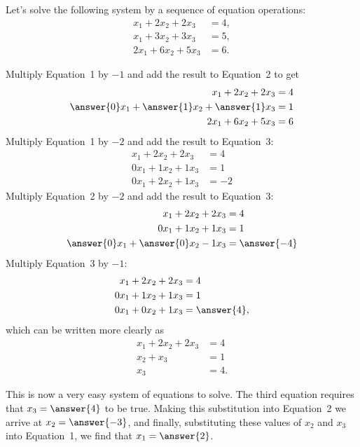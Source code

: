 \documentclass{ximera}
\begin{document}
\begin{example}
  Let's solve the following system by a sequence of equation operations:
  \begin{align*}
    x_1+2x_2+2x_3&=4,\\
    x_1+3x_2+3x_3&=5,\\
    2x_1+6x_2+5x_3&=6.
  \end{align*}

  \begin{exercise}
    Multiply Equation~1 by $-1$ and add the result to Equation~2 to get
    \begin{align*}
      x_1+2x_2+2x_3&=4\\
      \answer{0}x_1+\answer{1}x_2+ \answer{1} x_3&=1\\
      2x_1+6x_2+5x_3&=6
    \end{align*}
    Multiply Equation~1 by $-2$ and add the result to Equation~3:
    \begin{align*}
      x_1+2x_2+2x_3&=4\\
      0x_1+1x_2+ 1x_3&=1\\
      0x_1+2x_2+1x_3&=-2
    \end{align*}
    Multiply Equation~2 by $-2$ and add the result to Equation~3:
    \begin{align*}
      x_1+2x_2+2x_3&=4\\
      0x_1+1x_2+ 1x_3&=1\\
      \answer{0}x_1+\answer{0}x_2-1x_3&=\answer{-4}
    \end{align*}
    Multiply Equation~3 by $-1$:
    \begin{align*}
      x_1+2x_2+2x_3&=4\\
      0x_1+1x_2+ 1x_3&=1\\
      0x_1+0x_2+1x_3&=\answer{4},
    \end{align*}
    which can be written more clearly as
    \begin{align*}
      x_1+2x_2+2x_3&=4\\
      x_2+ x_3&=1\\
      x_3&=4.
    \end{align*}
  \end{exercise}

  \begin{question}
    This is now a very easy system of equations to solve.  The third
    equation requires that $x_3=\answer{4}$ to be true.  Making this substitution
    into Equation~2 we arrive at $x_2=\answer{-3}$, and finally, substituting
    these values of $x_2$ and $x_3$ into Equation~1, we find that
    $x_1=\answer{2}$.
    

\end{question}
\end{example}
\end{document}
